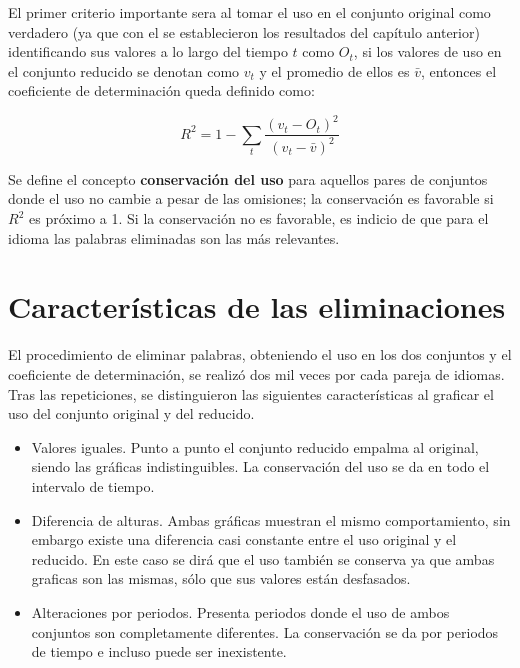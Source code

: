 El primer criterio importante sera al tomar el uso en el conjunto original como verdadero (ya que con el se establecieron los resultados del capítulo anterior) identificando sus valores a lo largo del tiempo $t$ como $O_{t}$, si los valores de uso en el conjunto reducido se denotan como  $v_{t}$ y el promedio de ellos es $\bar{v}$, entonces   el coeficiente de determinación queda definido como:
 
\begin{equation}
 \label{ec.dif_uso}
 R^{2} = 1 - \sum_{t} \frac{ \left( v_{t}- O_{t} \right)^{2}  }{ \left( v_{t} - \bar{v} \right)^{2} }
\end{equation}

Se define el concepto \textbf{conservación del uso} para aquellos pares de conjuntos donde el uso no cambie a pesar de las omisiones; la conservación es favorable si $R^{2}$ es próximo a 1.  Si la conservación no es favorable, es indicio de que para el idioma las palabras eliminadas son las más relevantes. 

\section{Características de las eliminaciones}

El procedimiento de eliminar palabras, obteniendo el uso en los dos conjuntos y el coeficiente de determinación, se realizó dos mil veces por cada pareja de idiomas.  Tras las repeticiones, se distinguieron las siguientes características al graficar el uso del conjunto original y del reducido. 


\begin{itemize}
	
	\item Valores iguales. Punto a punto el conjunto reducido empalma al original, siendo las gráficas indistinguibles. La conservación del uso se da en todo el intervalo de tiempo. 
	
	\item Diferencia de alturas. Ambas gráficas muestran el mismo comportamiento, sin embargo existe una diferencia casi constante entre el uso original y el reducido. En este caso se dirá que el uso también se conserva ya que ambas graficas son las mismas, sólo que sus valores están desfasados. 
	
	\item Alteraciones por periodos.  Presenta periodos donde el uso de ambos conjuntos son completamente diferentes. La conservación se da por periodos de tiempo e incluso puede ser inexistente.

	
\end{itemize}

